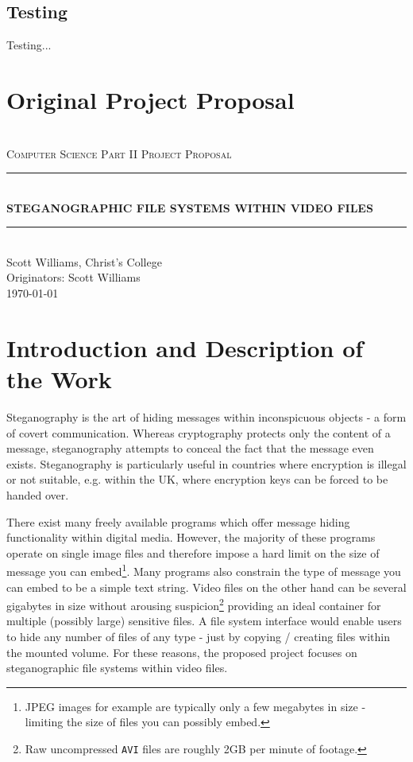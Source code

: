 \documentclass[paper=a4, fontsize=11pt,twoside]{scrartcl}
\makeatletter
\numberwithin{table}{section}
\numberwithin{figure}{section}
\numberwithin{algorithm}{section}
\newcommand{\HRule}[1]{\rule{\linewidth}{#1}}
\def\printauthor{%
    {\large \@author}}
\makeatother
\begin{document}
\subsection{Testing}
\label{app:codetest}

Testing...

\pagebreak

\section{Original Project Proposal} 

\begin{center}	
 	~\\[2.0cm]			
	\normalsize \textsc{Computer Science Part II Project Proposal}\\[2.0cm]     
    \HRule{0.5pt} \\                        
    \LARGE \textbf{\uppercase{Steganographic file systems within video files}}    
    \HRule{2pt} \\[30pt]        
    \normalsize Scott Williams, Christ's College\\[2pt]Originators: Scott Williams\\[25pt]           
    \normalsize \today            
     \vfill
\end{center}
\printauthor                
\newpage
\section*{Introduction and Description of the Work}

Steganography is the art of hiding messages within inconspicuous objects - a form of covert communication. Whereas cryptography protects only the content of a message, steganography attempts to conceal the fact that the message even exists. Steganography is particularly useful in countries where encryption is illegal or not suitable, e.g. within the UK, where encryption keys can be forced to be handed over.

There exist many freely available programs which offer message hiding functionality within digital media. However, the majority of these programs operate on single image files and therefore impose a hard limit on the size of message you can embed\footnote{JPEG images for example are typically only a few megabytes in size - limiting the size of files you can possibly embed.}. Many programs also constrain the type of message you can embed to be a simple text string. Video files on the other hand can be several gigabytes in size without arousing suspicion\footnote{Raw uncompressed \texttt{AVI} files are roughly 2GB per minute of footage.} providing an ideal container for multiple (possibly large) sensitive files. A file system interface would enable users to hide any number of files of any type - just by copying / creating files within the mounted volume. For these reasons, the proposed project focuses on steganographic file systems within video files.
\end{document}
